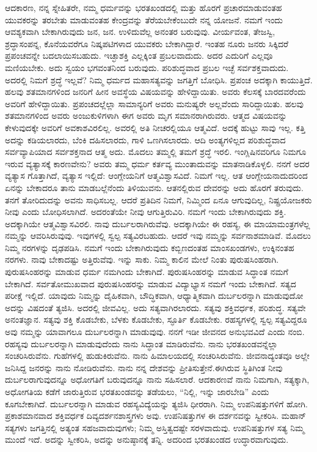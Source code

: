 ಆದಕಾರಣ, ನನ್ನ ಸ್ನೇಹಿತರೇ, ನಮ್ಮ ಧರ್ಮವನ್ನು ಭರತಖಂಡದಲ್ಲಿ ಮತ್ತು ಹೊರಗೆ ಪ್ರಚಾರಮಾಡುವಂತಹ ಯುವಕರನ್ನು ತರಬೇತು ಮಾಡುವಂತಹ ಕೇಂದ್ರವನ್ನು ತೆರೆಯಬೇಕೆಂಬುದೇ ನನ್ನ ಯೋಜನೆ. ನಮಗೆ ಇಂದು ಆವಶ್ಯಕವಾಗಿ ಬೇಕಾಗಿರುವುದು ಜನ, ಜನ. ಉಳಿದುವೆಲ್ಲ ಅನಂತರ ಬರುವುವು. ವೀರ್ಯವಂತ​, ತೇಜಸ್ವಿ, ಶ್ರದ್ಧಾಸಂಪನ್ನ, ಕೊನೆಯವರೆಗೂ ನಿಷ್ಕಪಟಿಗಳಾದ ಯುವಕರು ಬೇಕಾಗಿದ್ದಾರೆ. ಇಂತಹ ನೂರು ಜನರು ಸಿಕ್ಕಿದರೆ ಪ್ರಪಂಚವನ್ನೇ ಬದಲಾಯಿಸಬಹುದು. ಇಚ್ಛಾಶಕ್ತಿ ಎಲ್ಲಕ್ಕಿಂತ ಪ್ರಬಲವಾದುದು. ಅದರ ಎದುರಿಗೆ ಎಲ್ಲವೂ ಮಣಿಯಬೇಕು. ಅದು ಸ್ವಯಂ ಭಗವಂತನಿಂದ ಬರುವುದು. ಪರಿಶುದ್ಧವಾದ ಪ್ರಬಲ ಇಚ್ಛೆ ಸರ್ವಶಕ್ತವಾದುದು. ಅದರಲ್ಲಿ ನಿಮಗೆ ಶ್ರದ್ಧೆ ಇಲ್ಲವೆ? ನಿಮ್ಮ ಧರ್ಮದ ಮಹಾಸತ್ಯವನ್ನು ಜಗತ್ತಿಗೆ ಬೋಧಿಸಿ. ಪ್ರಪಂಚ ಅದಕ್ಕಾಗಿ ಕಾಯುತ್ತಿದೆ. ಹಲವು ಶತಮಾನಗಳಿಂದ ಜನರಿಗೆ ಹೀನ ಅವಸ್ಥೆಯ ವಿಷಯವನ್ನು ಹೇಳಿದ್ದಾಯಿತು. ಅವರು ಕೆಲಸಕ್ಕೆ ಬಾರದವರೆಂದು ಅವರಿಗೆ ಹೇಳಿದ್ದಾಯಿತು. ಪ್ರಪಂಚದಲ್ಲೆಲ್ಲಾ ಸಾಮಾನ್ಯರಿಗೆ ಅವರು ಮನುಷ್ಯರೇ ಅಲ್ಲವೆಂದು ಸಾರಿದ್ದಾಯಿತು. ಹಲವು ಶತಮಾನಗಳಿಂದ ಅವರು ಅಂಜುಕುಳಿಗಳಾಗಿ ಈಗ ಅವರು ಮೃಗ ಸಮಾನರಾಗಿರುವರು. ಆತ್ಮದ ವಿಷಯವನ್ನು ಕೇಳುವುದಕ್ಕೇ ಅವರಿಗೆ ಅವಕಾಶವಿರಲಿಲ್ಲ. ಅವರಲ್ಲಿ ಅತಿ ನೀಚರಲ್ಲಿಯೂ ಆತ್ಮವಿದೆ. ಅದಕ್ಕೆ ಹುಟ್ಟು ಸಾವು ಇಲ್ಲ. ಕತ್ತಿ ಅದನ್ನು ಕಡಿಯಲಾರದು, ಬೆಂಕಿ ದಹಿಸಲಾರದು, ಗಾಳಿ ಒಣಗಿಸಲಾರದು. ಆದಿ ಅಂತ್ಯಗಳಿಲ್ಲದ ಪರಿಶುದ್ಧವಾದ ಸರ್ವವ್ಯಾಪಿಯಾದ ಸರ್ವಶಕ್ತನಾದ ಆತ್ಮ ಅದು. ಮೊದಲು ತಮ್ಮಲ್ಲಿ ತಮಗೆ ಶ್ರದ್ಧೆ ಇರಲಿ. ಇಂಗ್ಲಿಷಿನವರಿಗೂ ನಿಮಗೂ ಇರುವ ವ್ಯತ್ಯಾಸಕ್ಕೆ ಕಾರಣವೇನು? ಅವರು ತಮ್ಮ ಧರ್ಮ ಕರ್ತವ್ಯ ಮುಂತಾದುವನ್ನು ಮಾತನಾಡಿಕೊಳ್ಳಲಿ. ನನಗೆ ಅದರ ವ್ಯತ್ಯಾಸ ಗೊತ್ತಾಗಿದೆ, ವ್ಯತ್ಯಾಸ ಇಲ್ಲಿದೆ: ಆಂಗ್ಲೇಯನಿಗೆ ಆತ್ಮವಿಶ್ವಾಸವಿದೆ. ನಿಮಗೆ ಇಲ್ಲ. ಆತ ಆಂಗ್ಲೇಯನಾದುದರಿಂದ ಏನನ್ನು ಬೇಕಾದರೂ ತಾನು ಮಾಡಬಲ್ಲೆನೆಂದು ತಿಳಿಯುವನು. ಆತನಲ್ಲಿರುವ ದೇವರನ್ನು ಅದು ಹೊರಗೆ ತರುವುದು. ತನಗೆ ತೋರಿದುದನ್ನು ಅವನು ಸಾಧಿಸಬಲ್ಲ. ಆದರೆ ಪ್ರತಿದಿನ ನಿಮಗೆ, ನಿಮ್ಮಿಂದ ಏನೂ ಆಗುವುದಿಲ್ಲ, ನಿಷ್ಪ್ರಯೋಜಕರು ನೀವು ಎಂದು ಬೋಧಿಸಲಾಗಿದೆ. ಅದರಂತೆಯೇ ನೀವು ಆಗುತ್ತಿರುವಿರಿ. ನಮಗೆ ಇಂದು ಬೇಕಾಗಿರುವುದು ಶಕ್ತಿ. ಅದಕ್ಕಾಗಿಯೇ ಆತ್ಮವಿಶ್ವಾಸವಿರಲಿ. ನಾವು ದುರ್ಬಲರಾಗಿರುವೆವು. ಅದಕ್ಕಾಗಿಯೇ ಈ ರಹಸ್ಯ, ಈ ಮಾಯಾಮಂತ್ರಗಳೆಲ್ಲ ನಮ್ಮನ್ನು ಆವರಿಸಿರುವುವು. ಇವುಗಳಲ್ಲಿ ಸ್ವಲ್ಪ ಸತ್ಯವಿರಬಹುದು. ಆದರೆ ಇವು ನಮ್ಮನ್ನು ಸರ್ವನಾಶಮಾಡಿವೆ. ಮೊದಲು ನಿಮ್ಮ ನರಗಳನ್ನು ದೃಢಪಡಿಸಿ. ನಮಗೆ ಇಂದು ಬೇಕಾಗಿರುವುದು ಕಬ್ಬಿಣದಂತಹ ಮಾಂಸಖಂಡಗಳು, ಉಕ್ಕಿನಂತಹ ನರಗಳು. ನಾವು ಬೇಕಾದಷ್ಟು ಅತ್ತಿರುವೆವು. ಇನ್ನು ಸಾಕು. ನಿಮ್ಮ ಕಾಲಿನ ಮೇಲೆ ನಿಂತು ಪುರುಷಸಿಂಹರಾಗಿ. ಪುರುಷಸಿಂಹರನ್ನು ಮಾಡುವ ಧರ್ಮ ನಮಗಿಂದು ಬೇಕಾಗಿದೆ. ಪುರುಷಸಿಂಹರನ್ನು ಮಾಡುವ ಸಿದ್ಧಾಂತ ನಮಗೆ ಬೇಕಾಗಿದೆ. ಸರ್ವತೋಮುಖವಾದ ಪುರುಷಸಿಂಹರನ್ನು ಮಾಡುವ ವಿದ್ಯಾಭ್ಯಾಸ ನಮಗೆ ಇಂದು ಬೇಕಾಗಿದೆ. ಸತ್ಯದ ಪರೀಕ್ಷೆ ಇಲ್ಲಿದೆ. ಯಾವುದು ನಿಮ್ಮನ್ನು ದೈಹಿಕ\-ವಾಗಿ, ಬೌದ್ಧಿಕವಾಗಿ, ಆಧ್ಯಾತ್ಮಿಕವಾಗಿ ದುರ್ಬಲರನ್ನಾಗಿ ಮಾಡುವುದೋ ಅದನ್ನು ವಿಷದಂತೆ ತ್ಯಜಿಸಿ. ಅದರಲ್ಲಿ ಜೀವವಿಲ್ಲ. ಅದು ಸತ್ಯವಾಗಿರಲಾರದು. ಸತ್ಯವು ಶಕ್ತಿವರ್ಧಕ, ಪರಿಶುದ್ಧ. ಸತ್ಯವೇ ಅನಂತಜ್ಞಾನ. ಸತ್ಯವು ಶಕ್ತಿ ಕೊಡಬೇಕು, ಬೆಳಕು ಕೊಡಬೇಕು, ಸ್ಫೂರ್ತಿ ಕೊಡಬೇಕು. ರಹಸ್ಯಗಳಲ್ಲಿ ಸ್ವಲ್ಪ ಸತ್ಯವಿದ್ದರೂ ಅವು ನಮ್ಮನ್ನು ಯಾವಾಗಲೂ ದುರ್ಬಲ\break ರನ್ನಾಗಿ ಮಾಡುವುವು. ನನಗೆ ಇಡೀ ಜೀವನದ ಅನುಭವವಿದೆ ಎಂದು ನಂಬಿ. ರಹಸ್ಯವು ದುರ್ಬಲರನ್ನಾಗಿ ಮಾಡುವುದೆಂದು ನಾನು ಸಿದ್ಧಾಂತ ಮಾಡಿರುವೆನು. ನಾನು ಭರತಖಂಡವನ್ನೆಲ್ಲಾ ಸಂಚರಿಸಿರುವೆನು. ಗುಹೆಗಳಲ್ಲಿ ಹುಡುಕಿರುವೆನು. ನಾನು ಹಿಮಾಲಯ\-ದಲ್ಲಿ ಸಂಚರಿಸಿರುವೆನು. ಜೀವನಾದ್ಯಂತವೂ ಅಲ್ಲೇ ಜನಿಸಿದ್ದ ಜನರನ್ನು ನಾನು ನೋಡಿರುವೆನು. ನಾನು ನನ್ನ ದೇಶವನ್ನು ಪ್ರೀತಿಸುತ್ತೇನೆ.\break ಈಗಿರುವ ಸ್ಥಿತಿಗಿಂತ ನೀವು ದುರ್ಬಲ\-ರಾಗುವುದನ್ನೂ ಅಧೋಗತಿಗೆ ಬರುವುದನ್ನೂ ನಾನು ಸಹಿಸಲಾರೆ. ಆದಕಾರಣವೆ ನಾನು ನಿಮಗಾಗಿ, ಸತ್ಯಕ್ಕಾಗಿ, ಅಧೋಗತಿಯ ಕಡೆಗೆ ಜಾರುತ್ತಿರುವ ಭರತಖಂಡವನ್ನು ತಡೆಯಲು, “ನಿಲ್ಲಿ, ಇನ್ನು ಜಾರಬೇಡಿ” ಎಂದು ಕೂಗಬೇಕಾಗಿದೆ. ದುರ್ಬಲರನ್ನಾಗಿ ಮಾಡುವ ರಹಸ್ಯವಿದ್ಯೆಯನ್ನು ತ್ಯಜಿಸಿ ಧೀರರಾಗಿ. ನಿಮ್ಮ ಉಪನಿಷತ್ತುಗಳಿಗೆ ಹೋಗಿ. ಪ್ರಕಾಶಮಾನವಾದ ಶಕ್ತಿವರ್ಧಕ ದಿವ್ಯದರ್ಶನಶಾಸ್ತ್ರಗಳು ಅವು. ಉಪನಿಷತ್ತುಗಳ ಈ ದರ್ಶನವನ್ನು ಸ್ವೀಕರಿಸಿ. ಮಹಾನ್​ ಸತ್ಯಗಳು ಜಗತ್ತಿನಲ್ಲಿ ಅತ್ಯಂತ ಸಹಜವಾದುವುಗಳು; ನಿಮ್ಮ ಅಸ್ತಿತ್ವದಷ್ಟೇ ಸರಳವಾದುವು. ಉಪನಿಷತ್ತುಗಳ ಸತ್ಯ ನಿಮ್ಮ ಮುಂದೆ ಇದೆ. ಅದನ್ನು ಸ್ವೀಕರಿಸಿ, ಅದನ್ನು ಅನುಷ್ಠಾನಕ್ಕೆ ತನ್ನಿ. ಅದರಿಂದ ಭರತಖಂಡದ ಉದ್ಧಾರವಾಗುವುದು.

